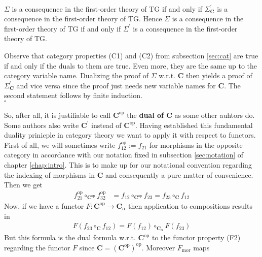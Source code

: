 \\
\begin{thm}
\label{thm:dp}
$\Sigma$ is a consequence in the first-order theory of TG if and only if $\Sigma_{\mathbf{C}}^{\prime}$ is a consequence in the first-order theory of TG. Hence $\Sigma$ is a consequence in the first-order theory of TG if and only if $\Sigma^{\prime}$ is a consequence in the first-order theory of TG.
\end{thm}
\begin{prf}[Sketch]
Observe that category properties (C1) and (C2) from subsection \ref{sec:cat} are true if and only if the duals to them are true. Even more, they are the same up to the category variable name. Dualizing the proof of $\Sigma$ w.r.t. $\mathbf{C}$ then yields a proof of $\Sigma_{\mathbf{C}}^{\prime}$ and vice versa since the proof just needs new variable names for $\mathbf{C}$. The second statement follows by finite induction.
\\
\phantom{proven}
\hfill
$\square$
\end{prf}
So, after all, it is justifiable to call $\mathbf{C}^{\mathrm{op}}$ the \textbf{dual of $\mathbf{C}$} as some other auhtors do. Some authors also write $\mathbf{C}^{\prime}$ instead of $\mathbf{C}^{\mathrm{op}}$. Having established this fundamental duality prinicple in category theory we want to apply it with respect to functors. First of all, we will sometimes write $f_{12}^{\mathrm{op}} := f_{21}$ for morphisms in the opposite category in accordance with our notation fixed in subsection \ref{sec:notation} of chapter \ref{chap:intro}. This is to make up for our notational convention regarding the indexing of morphisms in $\mathbf{C}$ and consequently a pure matter of convenience. Then we get
\begin{align*}
  f_{21}^{\mathrm{op}}
  \circ_{\mathbf{C}^{\mathrm{op}}}
  f_{32}^{\mathrm{op}}
  &=
  f_{12}
  \circ_{\mathbf{C}^{\mathrm{op}}}
  f_{23}
  =
  f_{23}
  \circ_{\mathbf{C}}
  f_{12}
\end{align*}
Now, if we have a functor $F \colon \mathbf{C}^{\mathrm{op}} \rightarrow \mathbf{C}_{\alpha}$ then application to compositions results in
\begin{align*}
  F(f_{23} \circ_{\mathbf{C}} f_{12})
  =
  F(f_{12})
  \circ_{\mathbf{C}_{\alpha}}
  F(f_{23})
\end{align*}
But this formula is the dual formula w.r.t. $\mathbf{C}^{\mathrm{op}}$ to the functor property (F2) regarding the functor $F$ since $\mathbf{C} = (\mathbf{C}^{\mathrm{op}})^{\mathrm{op}}$. Moreover $F_{\mathrm{mor}}$ maps
